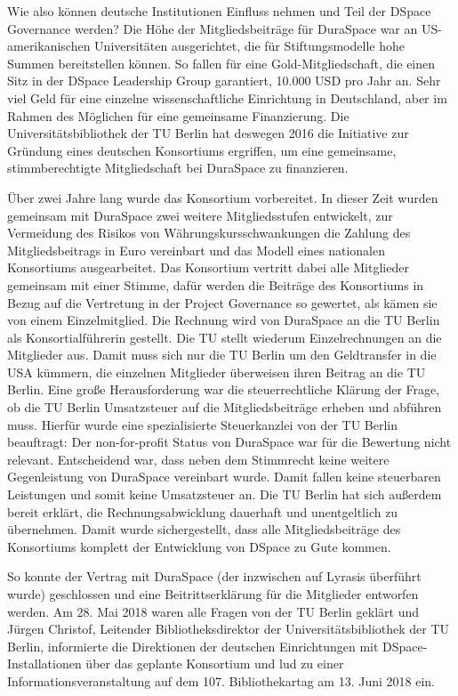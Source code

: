 \documentclass[a4paper,
fontsize=11pt,
oneside,
numbers=noperiodatend,
parskip=half-,
bibliography=totoc,
final
]{scrartcl}
\begin{document}
Wie also können deutsche Institutionen Einfluss nehmen und Teil der
DSpace Governance werden? Die Höhe der Mitgliedsbeiträge für DuraSpace
war an US-amerikanischen Universitäten ausgerichtet, die für
Stiftungsmodelle hohe Summen bereitstellen können. So fallen für eine
Gold-Mitgliedschaft, die einen Sitz in der DSpace Leadership Group
garantiert, 10.000 USD pro Jahr an. Sehr viel Geld für eine einzelne
wissenschaftliche Einrichtung in Deutschland, aber im Rahmen des
Möglichen für eine gemeinsame Finanzierung. Die Universitätsbibliothek
der TU Berlin hat deswegen 2016 die Initiative zur Gründung eines
deutschen Konsortiums ergriffen, um eine gemeinsame, stimmberechtigte
Mitgliedschaft bei DuraSpace zu finanzieren.

Über zwei Jahre lang wurde das Konsortium vorbereitet. In dieser Zeit
wurden gemeinsam mit DuraSpace zwei weitere Mitgliedsstufen entwickelt,
zur Vermeidung des Risikos von Währungskursschwankungen die Zahlung des
Mitgliedsbeitrags in Euro vereinbart und das Modell eines nationalen
Konsortiums ausgearbeitet. Das Konsortium vertritt dabei alle Mitglieder
gemeinsam mit einer Stimme, dafür werden die Beiträge des Konsortiums in
Bezug auf die Vertretung in der Project Governance so gewertet, als
kämen sie von einem Einzelmitglied. Die Rechnung wird von DuraSpace an
die TU Berlin als Konsortialführerin gestellt. Die TU stellt wiederum
Einzelrechnungen an die Mitglieder aus. Damit muss sich nur die TU
Berlin um den Geldtransfer in die USA kümmern, die einzelnen Mitglieder
überweisen ihren Beitrag an die TU Berlin. Eine große Herausforderung
war die steuerrechtliche Klärung der Frage, ob die TU Berlin
Umsatzsteuer auf die Mitgliedsbeiträge erheben und abführen muss.
Hierfür wurde eine spezialisierte Steuerkanzlei von der TU Berlin
beauftragt: Der non-for-profit Status von DuraSpace war für die
Bewertung nicht relevant. Entscheidend war, dass neben dem Stimmrecht
keine weitere Gegenleistung von DuraSpace vereinbart wurde. Damit fallen
keine steuerbaren Leistungen und somit keine Umsatzsteuer an. Die TU
Berlin hat sich außerdem bereit erklärt, die Rechnungsabwicklung
dauerhaft und unentgeltlich zu übernehmen. Damit wurde sichergestellt,
dass alle Mitgliedsbeiträge des Konsortiums komplett der Entwicklung von
DSpace zu Gute kommen.

So konnte der Vertrag mit DuraSpace (der inzwischen auf Lyrasis
überführt wurde) geschlossen und eine Beitrittserklärung für die
Mitglieder entworfen werden. Am 28. Mai 2018 waren alle Fragen von der
TU Berlin geklärt und Jürgen Christof, Leitender Bibliotheksdirektor der
Universitätsbibliothek der TU Berlin, informierte die Direktionen der
deutschen Einrichtungen mit DSpace-Installationen über das geplante
Konsortium und lud zu einer Informationsveranstaltung auf dem 107.
Bibliothekartag am 13. Juni 2018 ein.
\end{document}
